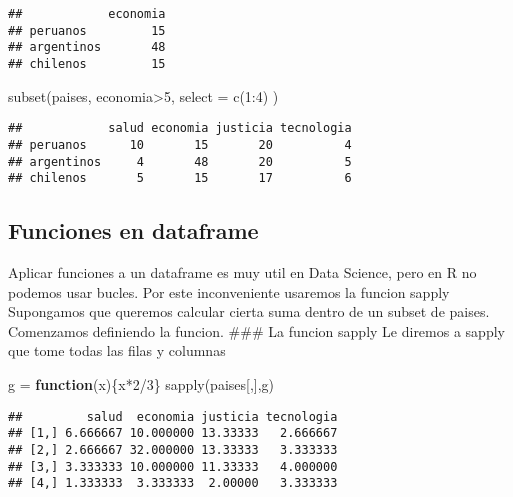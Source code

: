 \documentclass[
]{article}
\newenvironment{Shaded}{\begin{snugshade}}{\end{snugshade}}
\newcommand{\AttributeTok}[1]{\textcolor[rgb]{0.77,0.63,0.00}{#1}}
\newcommand{\ControlFlowTok}[1]{\textcolor[rgb]{0.13,0.29,0.53}{\textbf{#1}}}
\newcommand{\DecValTok}[1]{\textcolor[rgb]{0.00,0.00,0.81}{#1}}
\newcommand{\FunctionTok}[1]{\textcolor[rgb]{0.00,0.00,0.00}{#1}}
\newcommand{\NormalTok}[1]{#1}
\newcommand{\OtherTok}[1]{\textcolor[rgb]{0.56,0.35,0.01}{#1}}
\newcommand{\SpecialCharTok}[1]{\textcolor[rgb]{0.00,0.00,0.00}{#1}}
\begin{document}
\begin{verbatim}
##            economia
## peruanos         15
## argentinos       48
## chilenos         15
\end{verbatim}

\begin{Shaded}
\begin{Highlighting}[]
\FunctionTok{subset}\NormalTok{(paises, economia}\SpecialCharTok{\textgreater{}}\DecValTok{5}\NormalTok{, }\AttributeTok{select =} \FunctionTok{c}\NormalTok{(}\DecValTok{1}\SpecialCharTok{:}\DecValTok{4}\NormalTok{) )}
\end{Highlighting}
\end{Shaded}

\begin{verbatim}
##            salud economia justicia tecnologia
## peruanos      10       15       20          4
## argentinos     4       48       20          5
## chilenos       5       15       17          6
\end{verbatim}

\hypertarget{funciones-en-dataframe}{%
\subsection{Funciones en dataframe}\label{funciones-en-dataframe}}

Aplicar funciones a un dataframe es muy util en Data Science, pero en R
no podemos usar bucles. Por este inconveniente usaremos la funcion
sapply Supongamos que queremos calcular cierta suma dentro de un subset
de paises. Comenzamos definiendo la funcion. \#\#\# La funcion sapply Le
diremos a sapply que tome todas las filas y columnas

\begin{Shaded}
\begin{Highlighting}[]
\NormalTok{g }\OtherTok{=} \ControlFlowTok{function}\NormalTok{(x)\{x}\SpecialCharTok{*}\DecValTok{2}\SpecialCharTok{/}\DecValTok{3}\NormalTok{\}}
\FunctionTok{sapply}\NormalTok{(paises[,],g)}
\end{Highlighting}
\end{Shaded}

\begin{verbatim}
##         salud  economia justicia tecnologia
## [1,] 6.666667 10.000000 13.33333   2.666667
## [2,] 2.666667 32.000000 13.33333   3.333333
## [3,] 3.333333 10.000000 11.33333   4.000000
## [4,] 1.333333  3.333333  2.00000   3.333333
\end{verbatim}
\end{document}
